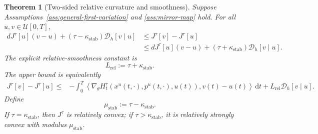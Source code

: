 \documentclass[10pt,a4paper]{amsart}
\newtheorem{theorem}{Theorem}
\newcommand{\dd}{\mathrm{d}}
\begin{document}
\begin{theorem}[Two-sided relative curvature and smoothness]
\label{thm:ensemble-relative-smoothness}
Suppose Assumptions~\ref{ass:general-first-variation} and
\ref{ass:mirror-map} hold. For all $u,v\in\mathcal U[0,T]$,
\begin{equation}
\label{eq:ensemble-relative-smoothness}
\begin{aligned}
dJ^\tau[u](v-u)+(\tau-\kappa_{\mathrm{stab}})\mathcal D_h[v\mid u]
&\le J^\tau[v]-J^\tau[u]\\
&\le dJ^\tau[u](v-u)+(\tau+\kappa_{\mathrm{stab}})\mathcal D_h[v\mid u].
\end{aligned}
\end{equation}
The explicit relative-smoothness constant is
\begin{equation}
\label{eq:Lrel-general}
L_{\mathrm{rel}}:=\tau+\kappa_{\mathrm{stab}}.
\end{equation}
The upper bound is equivalently
\begin{align}
\label{eq:ensemble-relative-smoothness-H}
J^\tau[v]-J^\tau[u]\le{}&-\int_0^T\left\langle
\nabla_\theta H_t^\tau(x^u(t,\cdot),p^u(t,\cdot),u(t)),
v(t)-u(t)\right\rangle\,\dd t +L_{\mathrm{rel}}\mathcal D_h[v\mid u].
\end{align}
Define
\begin{equation}
\label{eq:mu-stab-general}
\mu_{\mathrm{stab}}:=\tau-\kappa_{\mathrm{stab}}.
\end{equation}
If $\tau=\kappa_{\mathrm{stab}}$, then $J^\tau$ is relatively convex;
if $\tau>\kappa_{\mathrm{stab}}$, it is relatively strongly convex
with modulus $\mu_{\mathrm{stab}}$.
\end{theorem}
\end{document}

